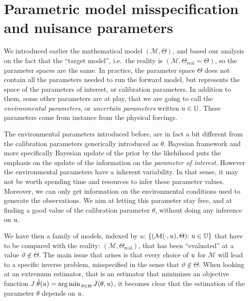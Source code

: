 \documentclass[../../Main_ManuscritThese.tex]{subfiles}
\begin{document}


\section{Parametric model misspecification and nuisance parameters}
\label{sec:model_misspecification}
We introduced earlier the mathematical model $(\mathcal{M},\Theta)$, and based our analysis on the fact that the ``target model'', i.e.\ the reality is $(\mathscr{M},\Theta_{\mathrm{real}} = \Theta)$, so the parameter spaces are the same.
In practice, the parameter space $\Theta$ does not contain all the parameters needed to run the forward model, but represents the space of the parameters of interest, or calibration parameters. In addition to them, some other parameters are at play, that we are going to call the \emph{environmental parameters}, or \emph{uncertain parameters} written $u\in \mathbb{U}$. These parameters come from instance from the physical forcings. 

The environmental parameters introduced before, are in fact a bit different from the calibration parameters generically introduced as $\theta$. Bayesian framework and more specifically Bayesian update of the prior by the likehihood puts the emphasis on the update of the information on the \emph{parameter of interest}. However the environmental parameters have a inherent variability. In that sense, it may not be worth spending time and resources to infer these parameter values. Moreover, we can only get information on the environmental conditions used to generate the observations.
We aim at letting this parameter stay free, and at finding a good value of the calibration parameter $\theta$, without doing any inference on $u$.

We have then a family of models, indexed by $u$: $\{(\mathcal{M}(\cdot,u) , \Theta);\, u \in \mathbb{U}\}$ that have to be compared with the reality: $(\mathscr{M}, \Theta_{\mathrm{real}})$, that has been ``evaluated'' at a value $\vartheta \notin \Theta$.
The main issue that arises is that every choice of $u$ for $\mathcal{M}$ will lead to a specific inverse problem, misspecified in the sense that $\vartheta \notin \Theta$.  When looking at an extremum estimator, that is an estimator that minimizes an objective function $J$ $\hat{\theta}_{\mathrm{}}(u) = \operatorname*{arg\,min \,}_{\theta \in \Theta} J(\theta,u)$, it becomes clear that the estimation of the parameter $\theta$ depends on $u$.
\end{document}

